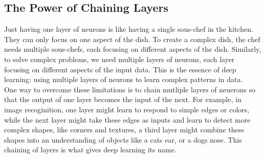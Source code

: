 \documentclass[9pt]{extarticle}
\begin{document}
\subsection{The Power of Chaining Layers}
Just having one layer of neurons is like having a single sous-chef in the kitchen. They can only focus on one aspect of the dish. To create a complex dish, the chef needs multiple sous-chefs, each focusing on different aspects of the dish. Similarly, to solve complex problems, we need multiple layers of neurons, each layer focusing on different aspects of the input data. This is the essence of deep learning: using multiple layers of neurons to learn complex patterns in data.\\[2ex]
One way to overcome these limitations is to chain mutliple layers of neuerons so that the output of one layer becomes the input of the next. For example, in image recoginition, one layer might learn to respond to simple edges or colors, while the next layer might take these edges as inputs and learn to detect more complex shapes, like corners and textures, a third layer might combine these shapes into an understanding of objects like a cats ear, or a dogs nose. This chaining of layers is what gives deep learning its name.
\end{document}
